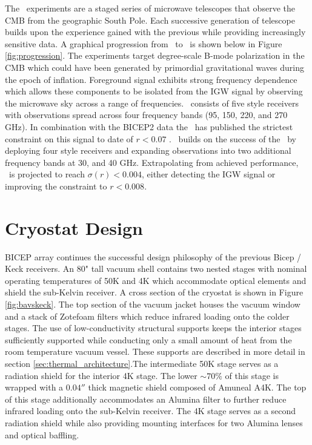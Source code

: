\documentclass[]{spie}  %
\begin{document}
The \bk\ experiments are a staged series of microwave telescopes that observe
the CMB from the geographic South Pole. Each successive generation of
telescope builds upon the experience gained with the previous while providing
increasingly sensitive data. A graphical progression from \ to
\biceparray\ is shown below in Figure \ref{fig:progression}. The experiments target degree-scale B-mode
polarization in the CMB which could have been generated by primordial
gravitational waves during the epoch of inflation. Foreground signal exhibits strong frequency dependence which allows these components to be isolated from the IGW
signal by observing the microwave sky across a range of frequencies.
\keckarray\ consists of five  style receivers with observations spread
across four frequency bands (95, 150, 220, and 270 GHz). In combination with the BICEP2 data the \keckarray\ has
published the strictest constraint on this signal to date of $r<0.07$
\cite{bk14}. \biceparray\ builds on the success of the \keckarray\ by
deploying four  style receivers and expanding observations into two
additional frequency bands at 30, and 40 GHz. Extrapolating from achieved performance,
\biceparray\ is projected to reach $\sigma(r)<0.004$, either detecting the IGW
signal or improving the constraint to $r<0.008$. 



	
\section{Cryostat Design}

BICEP array continues the successful design philosophy of
the previous Bicep / Keck receivers. An 80" tall vacuum shell contains two nested
stages with nominal operating temperatures of 50K and 4K which accommodate
optical elements and shield the sub-Kelvin receiver. A cross section of
the cryostat is shown in Figure \ref{fig:bavskeck}. The top section of the
vacuum jacket houses the vacuum window and a stack of Zotefoam filters which reduce infrared loading
onto the colder stages. The use of low-conductivity structural supports keeps
the interior stages sufficiently supported while conducting only a small
amount of heat from the room temperature vacuum vessel. These supports are
described in more detail in section \ref{sec:thermal_architecture}.The
intermediate 50K stage serves as a radiation shield for the interior 4K stage.
The lower $\sim70\%$ of this stage is wrapped with a $0.04''$ thick magnetic
shield composed of Amuneal A4K. The top of this stage additionally
accommodates an Alumina filter to further reduce infrared loading onto the
sub-Kelvin receiver. The 4K stage serves as a second radiation shield while
also providing mounting interfaces for two Alumina lenses and optical
baffling.
\end{document}
